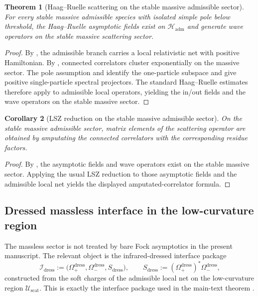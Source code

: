 \documentclass[11pt,a4paper]{article}
\newtheorem{theorem}{Theorem}[section]
\newtheorem{corollary}[theorem]{Corollary}
\theoremstyle{definition}
\theoremstyle{remark}
\begin{document}
\begin{theorem}[Haag--Ruelle scattering on the stable massive admissible sector]
\label{thm:haag-ruelle-admissible-massive}
For every stable massive admissible species with isolated simple pole below threshold, the
Haag--Ruelle asymptotic fields exist on $\mathcal H_{\mathrm{adm}}$ and generate wave operators on
the stable massive scattering sector.
\end{theorem}

\begin{proof}
By , the admissible
branch carries a local relativistic net with positive Hamiltonian. By
, connected correlators cluster exponentially on the
massive sector. The pole assumption and  identify the
one-particle subspace and give positive single-particle spectral projectors. The standard
Haag--Ruelle estimates therefore apply to admissible local operators, yielding the in/out fields and
the wave operators on the stable massive sector.
\end{proof}

\begin{corollary}[LSZ reduction on the stable massive admissible sector]
\label{cor:lsz-admissible-massive}
On the stable massive admissible sector, matrix elements of the scattering operator are obtained by
amputating the connected correlators with the corresponding residue factors.
\end{corollary}

\begin{proof}
By , the asymptotic fields and wave operators exist on the
stable massive sector. Applying the usual LSZ reduction to those asymptotic fields and the
admissible local net yields the displayed amputated-correlator formula.
\end{proof}

\subsection{Dressed massless interface in the low-curvature region}

The massless sector is not treated by bare Fock asymptotics in the present manuscript. The relevant
object is the infrared-dressed interface package
\[
\mathcal I_{\mathrm{dress}}
:=
\bigl(\Omega_+^{\mathrm{dress}},\Omega_-^{\mathrm{dress}},S_{\mathrm{dress}}\bigr),
\qquad
S_{\mathrm{dress}}:=(\Omega_+^{\mathrm{dress}})^\ast\Omega_-^{\mathrm{dress}},
\]
constructed from the soft charges of the admissible local net on the low-curvature region
$\mathcal U_{\mathrm{scat}}$. This is exactly the interface package used in the main-text theorem
.
\end{document}
